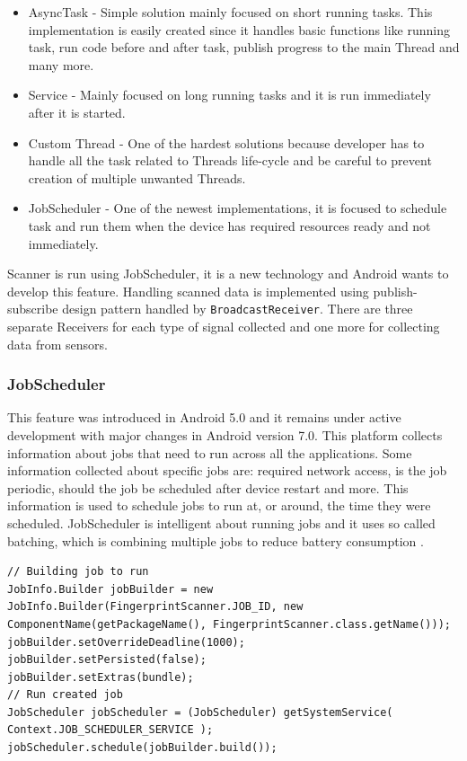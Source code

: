 \begin{itemize}
	\item AsyncTask - Simple solution mainly focused on short running tasks. This implementation is easily created since it handles basic functions like running task, run code before and after task, publish progress to the main Thread and many more.
	\item Service - Mainly focused on long running tasks and it is run immediately after it is started.
	\item Custom Thread - One of the hardest solutions because developer has to handle all the task related to Threads life-cycle and be careful to prevent creation of multiple unwanted Threads.
	\item JobScheduler - One of the newest implementations, it is focused to schedule task and run them when the device has required resources ready and not immediately.
\end{itemize}

Scanner is run using JobScheduler, it is a new technology and Android wants to develop this feature. Handling scanned data is implemented using publish-subscribe design pattern handled by \verb|BroadcastReceiver|. There are three separate Receivers for each type of signal collected and one more for collecting data from sensors. 

\subsubsection{JobScheduler}\label{subsubsec:JobScheduler}
This feature was introduced in Android 5.0 and it remains under active development with major changes in Android version 7.0. This platform collects information about jobs that need to run across all the applications. Some information collected about specific jobs are: required network access, is the job periodic, should the job be scheduled after device restart and more. This information is used to schedule jobs to run at, or around, the time they were scheduled. JobScheduler is intelligent about running jobs and it uses so called batching, which is combining multiple jobs to reduce battery consumption \cite{AD, SOTAJS}.

\begin{lstlisting}[caption=Schedule Firngerprint scanner job.]
// Building job to run
JobInfo.Builder jobBuilder = new JobInfo.Builder(FingerprintScanner.JOB_ID, new ComponentName(getPackageName(), FingerprintScanner.class.getName()));
jobBuilder.setOverrideDeadline(1000);
jobBuilder.setPersisted(false);
jobBuilder.setExtras(bundle);
// Run created job
JobScheduler jobScheduler = (JobScheduler) getSystemService( Context.JOB_SCHEDULER_SERVICE );
jobScheduler.schedule(jobBuilder.build());
\end{lstlisting}


